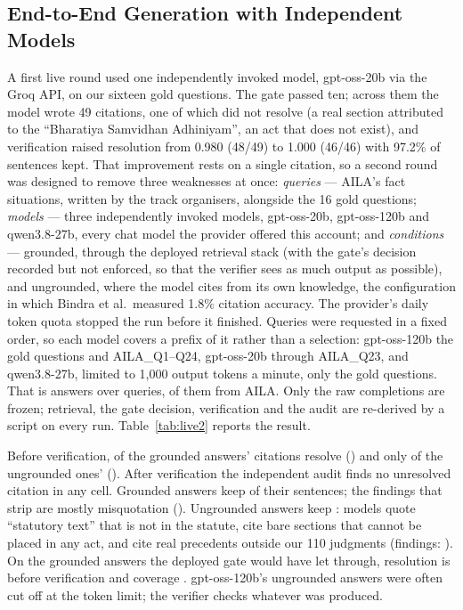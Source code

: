 \documentclass[conference]{IEEEtran}
\begin{document}
\subsection{End-to-End Generation with Independent Models}
\label{ssec:live}

A first live round used one independently invoked model, gpt-oss-20b via the Groq API, on our sixteen gold questions. The gate passed ten; across them the model wrote 49 citations, one of which did not resolve (a real section attributed to the ``Bharatiya Samvidhan Adhiniyam'', an act that does not exist), and verification raised resolution from 0.980 (48/49) to 1.000 (46/46) with 97.2\% of sentences kept. That improvement rests on a single citation, so a second round was designed to remove three weaknesses at once: \emph{queries} --- AILA's fact situations, written by the track organisers, alongside the 16 gold questions; \emph{models} --- three independently invoked models, gpt-oss-20b, gpt-oss-120b and qwen3.8-27b, every chat model the provider offered this account; and \emph{conditions} --- grounded, through the deployed retrieval stack (with the gate's decision recorded but not enforced, so that the verifier sees as much output as possible), and ungrounded, where the model cites from its own knowledge, the configuration in which Bindra et al.\ measured 1.8\% citation accuracy. The provider's daily token quota stopped the run before it finished. Queries were requested in a fixed order, so each model covers a prefix of it rather than a selection: gpt-oss-120b the gold questions and AILA\_Q1--Q24, gpt-oss-20b through AILA\_Q23, and qwen3.8-27b, limited to 1,000 output tokens a minute, only the gold questions. That is \RtwoAnswers{} answers over \RtwoQueries{} queries, \RtwoQueriesAila{} of them from AILA. Only the raw completions are frozen; retrieval, the gate decision, verification and the audit are re-derived by a script on every run. Table~\ref{tab:live2} reports the result.

\RtwoTable

Before verification, \RtwoGroundedPre{} of the grounded answers' citations resolve (\RtwoGroundedPreCounts{}) and only \RtwoUngroundedPre{} of the ungrounded ones' (\RtwoUngroundedPreCounts{}). After verification the independent audit finds no unresolved citation in any cell. Grounded answers keep \RtwoGroundedCov{} of their sentences; the findings that strip are mostly misquotation (\RtwoGroundedStrippedBy). Ungrounded answers keep \RtwoUngroundedCov{}: models quote ``statutory text'' that is not in the statute, cite bare sections that cannot be placed in any act, and cite real precedents outside our 110 judgments (findings: \RtwoUngroundedStrippedBy). On the \RtwoGateAnswers{} grounded answers the deployed gate would have let through, resolution is \RtwoGatePre{} before verification and coverage \RtwoGateCov{}. gpt-oss-120b's ungrounded answers were often cut off at the token limit; the verifier checks whatever was produced.
\end{document}
